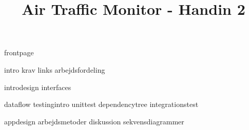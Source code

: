 \documentclass[a4paper]{article}								%
\title{Air Traffic Monitor - Handin 2}
\begin{document}

	{frontpage}

	\tableofcontents\thispagestyle{fancy} \newpage
	
	
	{intro}
	{krav}
	{links}
	{arbejdsfordeling}	

	{introdesign}
	{interfaces}
	

	{dataflow}
	{testingintro}
	{unittest}
	{dependencytree}
	{integrationstest}

	{appdesign}
	{arbejdsmetoder}
	{diskussion}
	{sekvensdiagrammer}
	

\end{document}
